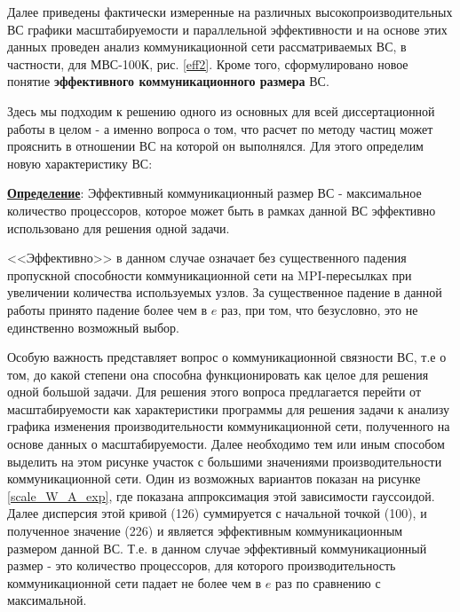 Далее приведены фактически измеренные на различных высокопроизводительных ВС графики масштабируемости и параллельной эффективности и на основе этих данных проведен анализ коммуникационной сети рассматриваемых ВС, в частности, для МВС-100К, рис. \ref{eff2}. Кроме того, сформулировано новое понятие \textbf{эффективного коммуникационного размера} ВС.
 




Здесь мы подходим к решению одного из основных для всей диссертационной работы в целом - а именно вопроса о том, что расчет по методу частиц может прояснить в отношении ВС на которой он выполнялся. Для этого определим новую характеристику ВС:

\underline{\textbf{Определение}}: Эффективный коммуникационный размер ВС - максимальное количество процессоров, которое может быть в рамках данной ВС эффективно использовано для решения одной задачи.  

<<Эффективно>> в данном случае означает без существенного падения пропускной способности коммуникационной сети на MPI-пересылках при увеличении количества используемых узлов. За существенное падение в данной работы принято падение более чем в $e$ раз, при том, что безусловно, это не единственно возможный выбор. 

Особую важность представляет вопрос о коммуникационной связности ВС, т.е о том, до какой степени она способна функционировать как целое для решения одной большой задачи. Для решения этого вопроса предлагается перейти от масштабируемости как характеристики программы для решения задачи к анализу графика изменения производительности коммуникационной сети, полученного на основе данных о масштабируемости. Далее необходимо тем или иным способом выделить на этом рисунке участок с большими значениями производительности коммуникационной сети.
Один из возможных вариантов показан на рисунке \ref{scale_W_A_exp}, где показана аппроксимация этой зависимости гауссоидой. Далее дисперсия этой кривой (126) суммируется с начальной точкой (100), и полученное значение (226) и является эффективным коммуникационным размером данной ВС. Т.е. в данном случае эффективный коммуникационный размер - это количество процессоров, для которого производительность коммуникационной сети падает не более чем в $e$ раз по сравнению с максимальной.


